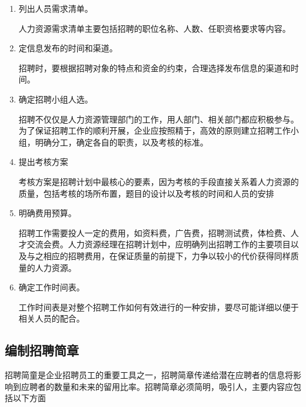     \begin{enumerate}
        \item 列出人员需求清单。

        人力资源需求清单主要包括招聘的职位名称、人数、任职资格要求等内容。

        \item 定信息发布的时间和渠道。

        招聘时，要根据招聘对象的特点和资金的约束，合理选择发布信息的渠道和时间。

        \item  确定招聘小组人选。

        招聘不仅仅是人力资源管理部门的工作，用人部门、相关部门都应积极参与。为了保证招聘工作的顺利开展，企业应按照精于，高效的原则建立招聘工作小组，明确分工，确定各自的职责，以及考核的标准。

        \item 提出考核方案

        考核方案是招聘计划中最核心的要素，因为考核的手段直接关系着人力资源的质量，包括考核的场所布置，题目的设计以及考核的时间和人员的安排

        \item 明确费用预算。

        招聘工作需要投人一定的费用，如资料费，广告费，招聘测试费，体检费、人才交流会费。人力资源经理在招聘计划中，应明确列出招聘工作的主要项目以及与之相应的招聘费用，在保证质量的前提下，力争以较小的代价获得同样质量的人力资源。

        \item 确定工作时间表。

        工作时间表是对整个招聘工作如何有效进行的一种安排，要尽可能详细以便于相关人员的配合。
    \end{enumerate}

\subsection {编制招聘简章}

    招聘简童是企业招聘员工的重要工具之一，招聘简章传递给潜在应聘者的信息将影响到应聘者的数量和未来的留用比率。招聘简章必须简明，吸引人，主要内容应包括以下方面

